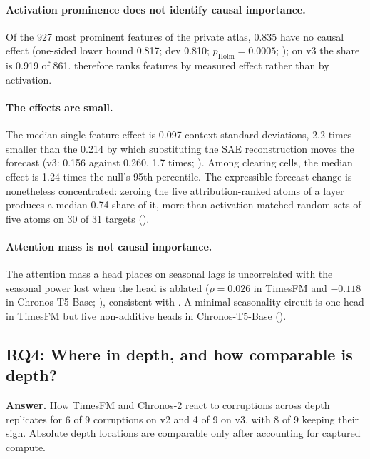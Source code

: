 \paragraph{Activation prominence does not identify causal importance.} Of the 927 most prominent features of the private
atlas, 0.835 have no causal effect (one-sided lower bound 0.817; dev 0.810; $p_{\text{Holm}}=0.0005$; ); on v3
the share is 0.919 of 861. \tool{} therefore ranks features by measured effect rather than by activation.

\paragraph{The effects are small.} The median single-feature effect is 0.097 context standard deviations, 2.2 times
smaller than the 0.214 by which substituting the SAE reconstruction moves the forecast (v3: 0.156 against 0.260, 1.7
times; ). Among clearing cells, the median effect is 1.24 times the null's 95th percentile. The expressible
forecast change is nonetheless concentrated: zeroing the five attribution-ranked atoms of a layer produces a median 0.74
share of it, more than activation-matched random sets of five atoms on 30 of 31 targets ().

\paragraph{Attention mass is not causal importance.} The attention mass a head places on seasonal lags is uncorrelated
with the seasonal power lost when the head is ablated ($\rho=0.026$ in TimesFM and $-0.118$ in Chronos-T5-Base;
), consistent with \citet{jain2019attention}. A minimal seasonality circuit is one head in TimesFM but five
non-additive heads in Chronos-T5-Base ().

\subsection{RQ4: Where in depth, and how comparable is depth?}
\label{sec:rq4}

\textbf{Answer.} How TimesFM and Chronos-2 react to corruptions across depth replicates for 6 of 9 corruptions on v2 and
4 of 9 on v3, with 8 of 9 keeping their sign. Absolute depth locations are comparable only after accounting for captured
compute.

